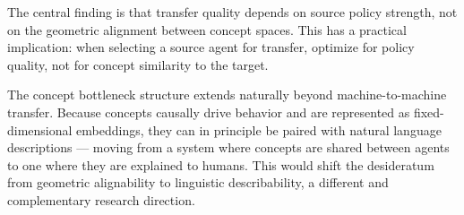 \documentclass[11pt,a4paper]{article}
\begin{document}
The central finding is that transfer quality depends on source policy strength, not on the geometric alignment between concept spaces. This has a practical implication: when selecting a source agent for transfer, optimize for policy quality, not for concept similarity to the target.

The concept bottleneck structure extends naturally beyond machine-to-machine transfer. Because concepts causally drive behavior and are represented as fixed-dimensional embeddings, they can in principle be paired with natural language descriptions --- moving from a system where concepts are shared between agents to one where they are explained to humans. This would shift the desideratum from geometric alignability to linguistic describability, a different and complementary research direction.



\end{document}
